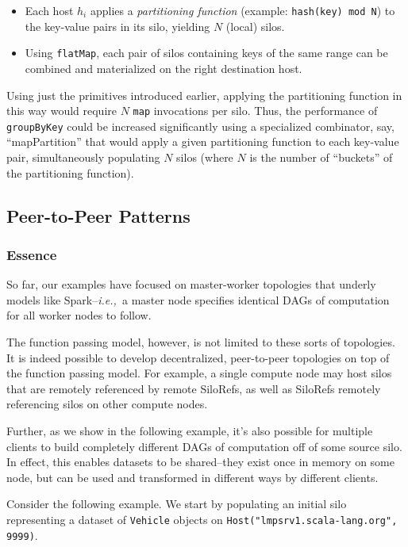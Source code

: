 \documentclass[10pt]{sigplanconf}
\theoremstyle{definition}
\theoremstyle{definition}
\newcommand{\ie}{{\em i.e.,~}}
\begin{document}
\begin{itemize}
\item Each host $h_i$ applies a {\em partitioning function} (example:
  \texttt{hash(key) mod N}) to the key-value pairs in its silo, yielding $N$
  (local) silos.

\item Using \verb|flatMap|, each pair of silos containing keys of the same
  range can be combined and materialized on the right destination host.
\end{itemize}

Using just the primitives introduced earlier, applying the partitioning
function in this way would require $N$ \verb|map| invocations per silo. Thus,
the performance of \verb|groupByKey| could be increased significantly using a
specialized combinator, say, ``mapPartition'' that would apply a given
partitioning function to each key-value pair, simultaneously populating $N$
silos (where $N$ is the number of ``buckets'' of the partitioning function).

\subsection{Peer-to-Peer Patterns}
\label{sec:decentral}

\subsubsection{Essence}

So far, our examples have focused on master-worker topologies that underly
models like Spark--\ie a master node specifies identical DAGs of computation for
all worker nodes to follow.

The function passing model, however, is not limited to these sorts of
topologies. It is indeed possible to develop decentralized, peer-to-peer
topologies on top of the function passing model. For example, a single compute
node may host silos that are remotely referenced by remote SiloRefs, as well as
SiloRefs remotely referencing silos on other compute nodes.

Further, as we show in the following example, it's also possible for multiple
clients to build completely different DAGs of computation off of some source
silo. In effect, this enables datasets to be shared--they exist once in memory
on some node, but can be used and transformed in different ways by different
clients.

Consider the following example. We start by populating an initial silo
representing a dataset of \verb|Vehicle| objects on
\verb|Host("lmpsrv1.scala-lang.org", 9999)|.
\end{document}
